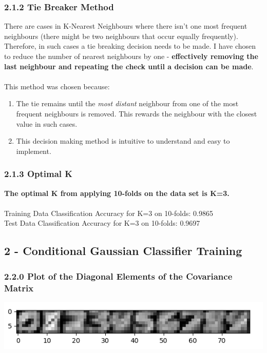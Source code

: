 \documentclass[10pt]{article}
\begin{document}
\subsubsection{2.1.2 Tie Breaker Method}

There are cases in K-Nearest Neighbours where there isn't one most frequent neighbours (there might be two neighbours that occur equally frequently). Therefore, in such cases a tie breaking decision needs to be made. I have chosen to reduce the number of nearest neighbours by one - \textbf{effectively removing the last neighbour and repeating the check until a decision can be made}.
\\ \\
This method was chosen because: 
\begin{enumerate}
\item The tie remains until the \textit{most distant} neighbour from one of the most frequent neighbours is removed. This rewards the neighbour with the closest value in such cases.
\item This decision making method is intuitive to understand and easy to implement.
\end{enumerate}

\subsubsection{2.1.3 Optimal K}

\textbf{The optimal K from applying 10-folds on the data set is K=3.}
\\ \\
Training Data Classification Accuracy for K=3 on 10-folds: 0.9865
\\
Test Data Classification Accuracy for K=3 on 10-folds: 0.9697


\subsection{2 -  Conditional Gaussian Classifier Training}

\subsubsection{2.2.0 Plot of the Diagonal Elements of the Covariance Matrix}

\begin{center}
\includegraphics[scale=1]{covariances.png}
\end{center}
\end{document}
